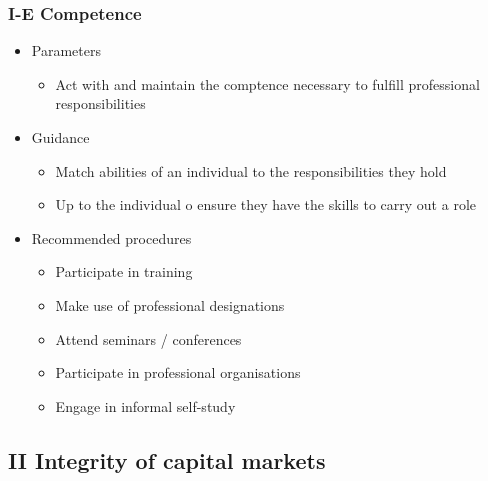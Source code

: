\documentclass[../notes_compiled.tex]{subfiles}
\begin{document}
\subsubsection{I-E Competence}
\begin{itemize}
\item Parameters
\begin{itemize}
\item Act with and maintain the comptence necessary to fulfill professional responsibilities
\end{itemize}
\item Guidance
\begin{itemize}
\item Match abilities of an individual to the responsibilities they hold
\item Up to the individual o ensure they have the skills to carry out a role
\end{itemize}
\item Recommended procedures
\begin{itemize}
\item Participate in training
\item Make use of professional designations
\item Attend seminars / conferences
\item Participate in professional organisations
\item Engage in informal self-study
\end{itemize}
\end{itemize}
\subsection{II Integrity of capital markets}
\end{document}
